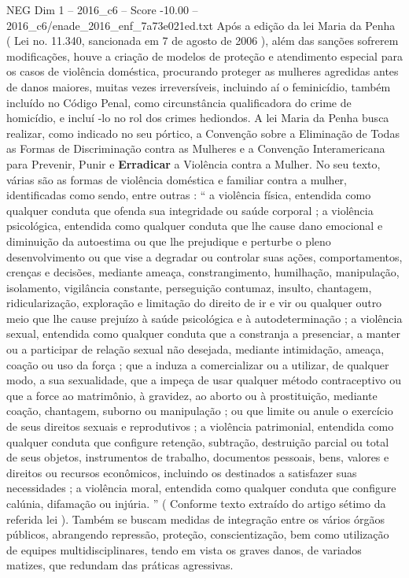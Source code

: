 \begin{textsample}{NEG Dim 1 – 2016\_c6 – Score -10.00 – 2016\_c6/enade\_2016\_enf\_7a73e021ed.txt}
Após a edição da lei Maria da Penha ( Lei no. 11.340, sancionada em 7 de agosto de 2006 ), além das sanções sofrerem modificações, houve a criação de modelos de proteção e atendimento especial para os casos de violência doméstica, procurando proteger as mulheres agredidas antes de danos maiores, muitas vezes irreversíveis, incluindo aí o feminicídio, também incluído no Código Penal, como circunstância qualificadora do crime de homicídio, e incluí -lo no rol dos crimes hediondos.
A lei Maria da Penha busca realizar, como indicado no seu pórtico, a Convenção sobre a Eliminação de Todas as Formas de Discriminação contra as Mulheres e a Convenção Interamericana para Prevenir, Punir e \textbf{Erradicar} a Violência contra a Mulher.
No seu texto, várias são as formas de violência doméstica e familiar contra a mulher, identificadas como sendo, entre outras : “ a violência física, entendida como qualquer conduta que ofenda sua integridade ou saúde corporal ; a violência psicológica, entendida como qualquer conduta que lhe cause dano emocional e diminuição da autoestima ou que lhe prejudique e perturbe o pleno desenvolvimento ou que vise a degradar ou controlar suas ações, comportamentos, crenças e decisões, mediante ameaça, constrangimento, humilhação, manipulação, isolamento, vigilância constante, perseguição contumaz, insulto, chantagem, ridicularização, exploração e limitação do direito de ir e vir ou qualquer outro meio que lhe cause prejuízo à saúde psicológica e à autodeterminação ; a violência sexual, entendida como qualquer conduta que a constranja a presenciar, a manter ou a participar de relação sexual não desejada, mediante intimidação, ameaça, coação ou uso da força ; que a induza a comercializar ou a utilizar, de qualquer modo, a sua sexualidade, que a impeça de usar qualquer método contraceptivo ou que a force ao matrimônio, à gravidez, ao aborto ou à prostituição, mediante coação, chantagem, suborno ou manipulação ; ou que limite ou anule o exercício de seus direitos sexuais e reprodutivos ; a violência patrimonial, entendida como qualquer conduta que configure retenção, subtração, destruição parcial ou total de seus objetos, instrumentos de trabalho, documentos pessoais, bens, valores e direitos ou recursos econômicos, incluindo os destinados a satisfazer suas necessidades ; a violência moral, entendida como qualquer conduta que configure calúnia, difamação ou injúria. ” ( Conforme texto extraído do artigo sétimo da referida lei ).
Também se buscam medidas de integração entre os vários órgãos públicos, abrangendo repressão, proteção, conscientização, bem como utilização de equipes multidisciplinares, tendo em vista os graves danos, de variados matizes, que redundam das práticas agressivas.

\end{textsample}
